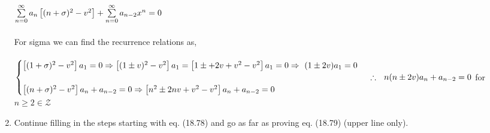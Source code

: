 \documentclass[fleqn]{article}
\begin{document}
\begin{enumerate}
{        \\
        $
          \sum\limits_{n=0}^{\infty}a_n \left[(n+\sigma)^2-v^2\right]+\sum\limits_{n=0}^{\infty} a_{n-2} x^n=0 \\
        $
        \\ 
        \\
        For sigma we can find the recurrence relations as,  \\
        \\
        $
          \begin{cases}
            \left[(1+\sigma)^2-v^2\right]a_1=0 \Rightarrow \left[(1\pm v)^2-v^2\right]a_1=\left[1\pm+2v+v^2-v^2\right]a_1=0 \Rightarrow ~ (1\pm 2v)a_1=0 \\
            \\
            \left[(n+\sigma)^2-v^2\right]a_n+a_{n-2}=0 \Rightarrow \left[n^2 \pm 2nv+v^2-v^2\right]a_n+a_{n-2}=0 \\
          \end{cases} \\
          \\ \\
          \therefore ~~ n(n\pm 2v)a_n+a_{n-2}=0 
        $
         for $n \geq 2 \in \mathcal{Z}$
      }

    \item Continue filling in the steps starting with eq. (18.78) and go as far as proving eq. (18.79) (upper line only). 
    

\end{enumerate}
\end{document}
